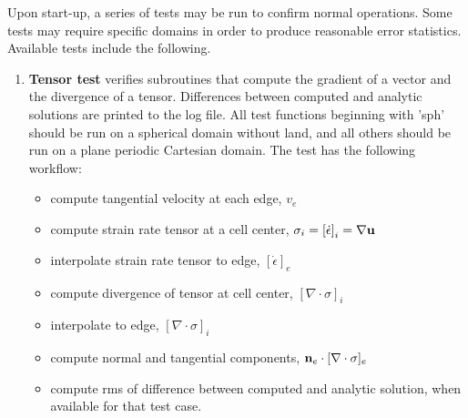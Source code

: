 Upon start-up, a series of tests may be run to confirm normal operations.  Some tests may require specific domains in order to produce reasonable error statistics.  Available tests include the following.

\begin{enumerate}
\item {\bf Tensor test} verifies subroutines that compute the gradient of a vector and the divergence of a tensor.  Differences between computed and analytic solutions are printed to the log file.  All test functions beginning with 'sph' should be run on a spherical domain without land, and all others should be run on a plane periodic Cartesian domain.  The test has the following workflow:
\begin{itemize}
\item compute tangential velocity at each edge, $v_e$
\item compute strain rate tensor at a cell center, $\sigma_i=\left[\dot\epsilon  \right]_i=\nabla {\bf u}$
\item interpolate strain rate tensor to edge, $\left[\dot\epsilon  \right]_e$
\item compute divergence of tensor at cell center, $\left[\nabla \cdot \sigma\right]_i$
\item interpolate to edge, $\left[\nabla \cdot \sigma\right]_i$
\item compute normal and tangential components, ${\bf n}_e\cdot[\nabla \cdot \sigma]_{e}$
\item compute rms of difference between computed and analytic solution, when available for that test case.
\end{itemize}
\end{enumerate}
